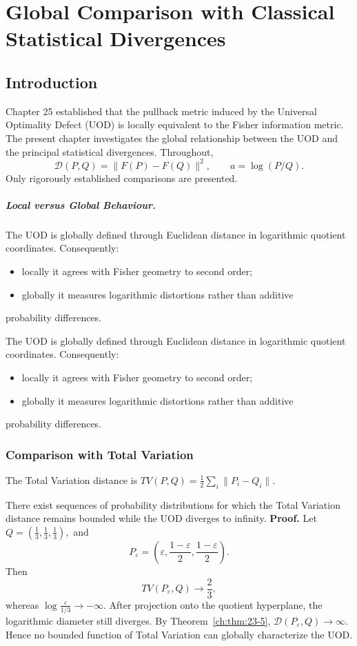 \chapter[Global Comparison]{Global Comparison with Classical Statistical Divergences}
\section{Introduction}
Chapter 25 established that the pullback metric induced by the Universal
Optimality Defect (UOD) is locally equivalent to the Fisher information
metric. The present chapter investigates the global relationship between
the UOD and the principal statistical divergences.
Throughout,
\[ \mathcal{D}(P,Q)=\|F(P)-F(Q)\|^{2}, \qquad
a=\log(P/Q). \]
Only rigorously established comparisons are presented.
\paragraph{Local versus Global Behaviour.}
The UOD is globally defined through Euclidean distance in logarithmic
quotient coordinates. Consequently:
\begin{itemize}
  \item locally it agrees with Fisher geometry to second order;
  \item globally it measures logarithmic distortions rather than additive
\end{itemize}
    probability differences.


The UOD is globally defined through Euclidean distance in logarithmic
quotient coordinates. Consequently:
\begin{itemize}
  \item locally it agrees with Fisher geometry to second order;
  \item globally it measures logarithmic distortions rather than additive
\end{itemize}
    probability differences.
\subsection{Comparison with Total Variation}\label{ch:thm:26-1}
The Total Variation distance is
$TV(P,Q)=\frac12\sum_{i}\|P_i-Q_i\|.$
\begin{theorem}

There exist sequences of probability distributions for which the Total
Variation distance remains bounded while the UOD diverges to infinity.
\textbf{Proof.}
Let
$Q=\left(\frac13,\frac13,\frac13\right),$
and
\[ P_\varepsilon= \left( \varepsilon,
\frac{1-\varepsilon}{2}, \frac{1-\varepsilon}{2}
\right). \]
Then
\[ TV(P_\varepsilon,Q)\longrightarrow\frac23,
\]
whereas
$\log\frac{\varepsilon}{1/3}\longrightarrow-\infty.$
After projection onto the quotient hyperplane, the logarithmic diameter
still diverges. By Theorem~\ref{ch:thm:23-5},
$\mathcal{D}(P_\varepsilon,Q)\longrightarrow\infty.$
Hence no bounded function of Total Variation can globally characterize
the UOD. 
\end{theorem}


